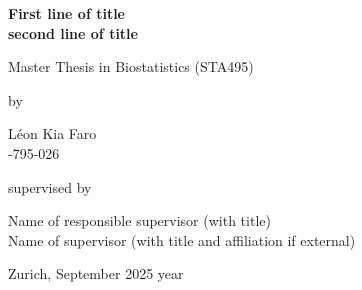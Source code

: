 \renewcommand\familydefault{\sfdefault} 


\thispagestyle{empty}
\renewcommand{\baselinestretch}{1.5}\normalfont
\begin{center}
\setlength{\parindent}{0cm}
\bf\Large%
First line of title \\
second line of title
\normalfont



\hrulefill

\vspace*{4cm}

\large
Master Thesis in Biostatistics (STA495) 
\vspace*{12mm}

by

\vspace*{12mm}

Léon Kia Faro\\
-795-026\\
\normalfont
\vspace*{4cm}

supervised by

\vspace*{1cm}

Name of responsible supervisor (with title)\\
Name of supervisor (with title and affiliation if external)

\vfill

Zurich, September 2025 year
\end{center}
\renewcommand\familydefault{\rmdefault}%
\renewcommand{\baselinestretch}{1.0}\rm 
\setcounter{page}{0}
\newpage
\vspace*{12cm}~\thispagestyle{empty}
\newpage

